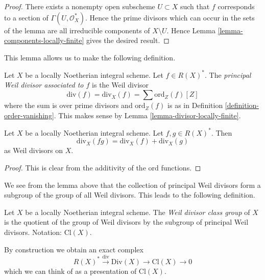 \begin{proof}
There exists a nonempty open subscheme $U \subset X$ such that $f$
corresponds to a section of $\Gamma(U, \mathcal{O}_X^*)$. Hence the
prime divisors which can occur in the sets of the lemma are all
irreducible components of $X \setminus U$.
Hence Lemma \ref{lemma-components-locally-finite} gives the desired result.
\end{proof}

\noindent
This lemma allows us to make the following definition.

\begin{definition}
\label{definition-principal-divisor}
Let $X$ be a locally Noetherian integral scheme. Let $f \in R(X)^*$.
The {\it principal Weil divisor associated to $f$} is the Weil divisor
$$
\text{div}(f) = \text{div}_X(f) = \sum \text{ord}_Z(f) [Z]
$$
where the sum is over prime divisors and $\text{ord}_Z(f)$ is as in
Definition \ref{definition-order-vanishing}. This makes sense
by Lemma \ref{lemma-divisor-locally-finite}.
\end{definition}

\begin{lemma}
\label{lemma-div-additive}
Let $X$ be a locally Noetherian integral scheme. Let $f, g \in R(X)^*$. Then
$$
\text{div}_X(fg) = \text{div}_X(f) + \text{div}_X(g)
$$
as Weil divisors on $X$.
\end{lemma}

\begin{proof}
This is clear from the additivity of the $\text{ord}$ functions.
\end{proof}

\noindent
We see from the lemma above that the collection of principal Weil divisors
form a subgroup of the group of all Weil divisors. This leads to the following
definition.

\begin{definition}
\label{definition-class-group}
Let $X$ be a locally Noetherian integral scheme. The
{\it Weil divisor class group} of $X$ is the quotient of
the group of Weil divisors by the subgroup of principal Weil divisors.
Notation: $\text{Cl}(X)$.
\end{definition}

\noindent
By construction we obtain an exact complex
\begin{equation}
\label{equation-Weil-divisor-class}
R(X)^* \xrightarrow{\text{div}} \text{Div}(X) \to \text{Cl}(X) \to 0
\end{equation}
which we can think of as a presentation of $\text{Cl}(X)$.

